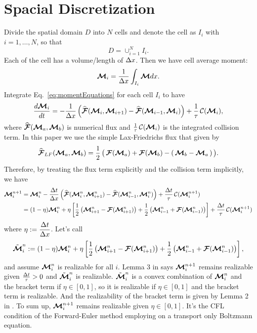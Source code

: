 \section{Spacial Discretization}\label{se:SpacialDiscretization}

Divide the spatial domain $D$ into $N$ cells and denote the cell as $I_{i}$ with $i = 1,\ldots,N$, so that
\begin{equation*}
D = \cup_{i = 1}^{N} I_{i}.
\end{equation*}
Each of the cell has a volume/length of $\Delta x$.
Then we have cell average moment:
\begin{equation}
\boldsymbol{\mathcal{M}}_{i} = \dfrac{1}{\Delta x} \int_{I_i}\boldsymbol{\mathcal{M}} dx.
\end{equation}
Integrate Eq.~\eqref{eq:momentEquations} for each cell $I_{i}$ to have
\begin{equation}
\dfrac{d \boldsymbol{\mathcal{M}}_{i}}{d t} = - \dfrac{1}{\Delta x} \left( \widehat{\boldsymbol{\mathcal{F}}}(\boldsymbol{\mathcal{M}}_{i},\boldsymbol{\mathcal{M}}_{i+1}) -  \widehat{\boldsymbol{\mathcal{F}}}(\boldsymbol{\mathcal{M}}_{i-1},\boldsymbol{\mathcal{M}}_{i})\right) + \frac{1}{\tau}\,\mathcal{C}(\boldsymbol{\mathcal{M}}_{i}),
\end{equation}
where $\widehat{\boldsymbol{\mathcal{F}}}(\boldsymbol{\mathcal{M}}_{a},\boldsymbol{\mathcal{M}}_{b})$ is numerical flux and $\frac{1}{\tau}\,\mathcal{C}(\boldsymbol{\mathcal{M}}_{i})$ is the integrated collision term.
In this paper we use the simple Lax-Friedrichs flux that given by
\begin{equation}
  \widehat{\boldsymbol{\mathcal{F}}}_{LF}(\boldsymbol{\mathcal{M}}_{a},\boldsymbol{\mathcal{M}}_{b})
  =\frac{1}{2}\,\big(\,\boldsymbol{\mathcal{F}}(\boldsymbol{\mathcal{M}}_{a})+\boldsymbol{\mathcal{F}}(\boldsymbol{\mathcal{M}}_{b})-(\,\boldsymbol{\mathcal{M}}_{b}-\boldsymbol{\mathcal{M}}_{a}\,)\,\big).
\end{equation}
Therefore, by treating the flux term explicitly and the collision term implicitly, we have
\begin{align}
\boldsymbol{\mathcal{M}}_{i}^{n+1} 
& = \boldsymbol{\mathcal{M}}_{i}^{n} - \dfrac{\Delta t}{\Delta x} \left( \widehat{\boldsymbol{\mathcal{F}}}(\boldsymbol{\mathcal{M}}^{n}_{i},\boldsymbol{\mathcal{M}}^{n}_{i+1}) -  \widehat{\boldsymbol{\mathcal{F}}}(\boldsymbol{\mathcal{M}}^{n}_{i-1},\boldsymbol{\mathcal{M}}^{n}_{i})\right) + \frac{\Delta t}{\tau}\,\mathcal{C}(\boldsymbol{\mathcal{M}}^{n+1}_{i}) \nonumber \\
& = (1-\eta)\boldsymbol{\mathcal{M}}_{i}^{n} + \eta\left[ \frac{1}{2}\left( \boldsymbol{\mathcal{M}}^{n}_{i+1}-\boldsymbol{\mathcal{F}}(\boldsymbol{\mathcal{M}}^{n}_{i+1})\right)  + \frac{1}{2}\left( \boldsymbol{\mathcal{M}}^{n}_{i-1}+\boldsymbol{\mathcal{F}}(\boldsymbol{\mathcal{M}}^{n}_{i-1})\right)\right]  + \frac{\Delta t}{\tau}\,\mathcal{C}(\boldsymbol{\mathcal{M}}^{n+1}_{i})
\end{align}
where $\eta := \dfrac{\Delta t}{\Delta x}$.
Let's call
\begin{align*}
\tilde{\boldsymbol{\mathcal{M}}}^{n}_{i} := (1-\eta)\boldsymbol{\mathcal{M}}_{i}^{n} + \eta\left[ \frac{1}{2}\left( \boldsymbol{\mathcal{M}}^{n}_{i+1}-\boldsymbol{\mathcal{F}}(\boldsymbol{\mathcal{M}}^{n}_{i+1})\right)  + \frac{1}{2}\left( \boldsymbol{\mathcal{M}}^{n}_{i-1}+\boldsymbol{\mathcal{F}}(\boldsymbol{\mathcal{M}}^{n}_{i-1})\right)\right],
\end{align*} 
and assume $\boldsymbol{\mathcal{M}}_{i}^{n}$ is realizable for all $i$. 
Lemma 3 in \cite{chu_2018} says $\boldsymbol{\mathcal{M}}^{n+1}_{i}$ remains realizable given $\frac{\Delta t}{\tau} > 0$ and $\tilde{\boldsymbol{\mathcal{M}}}^{n}_{i}$ is realizable.
$\tilde{\boldsymbol{\mathcal{M}}}^{n}_{i}$ is a convex combination of $\boldsymbol{\mathcal{M}}_{i}^{n}$ and the bracket term if $\eta \in [0,1]$, so it is realizable if $\eta \in [0,1]$ and the bracket term is realizable.
And the realizability of the bracket term is given by Lemma 2 in \cite{chu_2018}.
To sum up, $\boldsymbol{\mathcal{M}}^{n+1}_{i}$ remains realizable given $\eta \in [0,1]$.
It's the CFL condition of the Forward-Euler method employing on a transport only Boltzmann equation.
